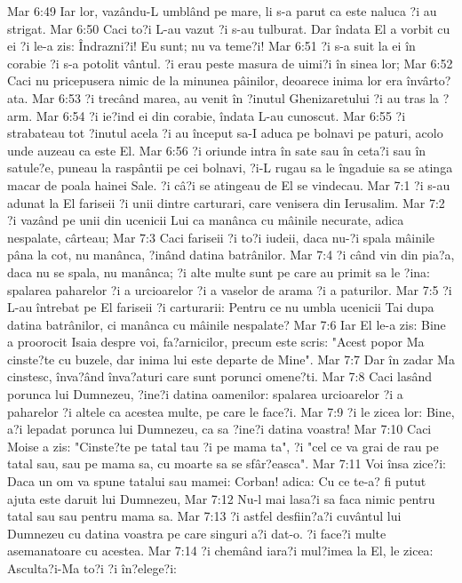 Mar 6:49  Iar lor, vazându-L umblând pe mare, li s-a parut ca este naluca ?i au strigat.
Mar 6:50  Caci to?i L-au vazut ?i s-au tulburat. Dar îndata El a vorbit cu ei ?i le-a zis: Îndrazni?i! Eu sunt; nu va teme?i!
Mar 6:51  ?i s-a suit la ei în corabie ?i s-a potolit vântul. ?i erau peste masura de uimi?i în sinea lor;
Mar 6:52  Caci nu pricepusera nimic de la minunea pâinilor, deoarece inima lor era învârto?ata.
Mar 6:53  ?i trecând marea, au venit în ?inutul Ghenizaretului ?i au tras la ?arm.
Mar 6:54  ?i ie?ind ei din corabie, îndata L-au cunoscut.
Mar 6:55  ?i strabateau tot ?inutul acela ?i au început sa-I aduca pe bolnavi pe paturi, acolo unde auzeau ca este El.
Mar 6:56  ?i oriunde intra în sate sau în ceta?i sau în satule?e, puneau la raspântii pe cei bolnavi, ?i-L rugau sa le îngaduie sa se atinga macar de poala hainei Sale. ?i câ?i se atingeau de El se vindecau.
Mar 7:1  ?i s-au adunat la El fariseii ?i unii dintre carturari, care venisera din Ierusalim.
Mar 7:2  ?i vazând pe unii din ucenicii Lui ca manânca cu mâinile necurate, adica nespalate, cârteau;
Mar 7:3  Caci fariseii ?i to?i iudeii, daca nu-?i spala mâinile pâna la cot, nu manânca, ?inând datina batrânilor.
Mar 7:4  ?i când vin din pia?a, daca nu se spala, nu manânca; ?i alte multe sunt pe care au primit sa le ?ina: spalarea paharelor ?i a urcioarelor ?i a vaselor de arama ?i a paturilor.
Mar 7:5  ?i L-au întrebat pe El fariseii ?i carturarii: Pentru ce nu umbla ucenicii Tai dupa datina batrânilor, ci manânca cu mâinile nespalate?
Mar 7:6  Iar El le-a zis: Bine a proorocit Isaia despre voi, fa?arnicilor, precum este scris: "Acest popor Ma cinste?te cu buzele, dar inima lui este departe de Mine".
Mar 7:7  Dar în zadar Ma cinstesc, înva?ând înva?aturi care sunt porunci omene?ti.
Mar 7:8  Caci lasând porunca lui Dumnezeu, ?ine?i datina oamenilor: spalarea urcioarelor ?i a paharelor ?i altele ca acestea multe, pe care le face?i.
Mar 7:9  ?i le zicea lor: Bine, a?i lepadat porunca lui Dumnezeu, ca sa ?ine?i datina voastra!
Mar 7:10  Caci Moise a zis: "Cinste?te pe tatal tau ?i pe mama ta", ?i "cel ce va grai de rau pe tatal sau, sau pe mama sa, cu moarte sa se sfâr?easca".
Mar 7:11  Voi însa zice?i: Daca un om va spune tatalui sau mamei: Corban! adica: Cu ce te-a? fi putut ajuta este daruit lui Dumnezeu,
Mar 7:12  Nu-l mai lasa?i sa faca nimic pentru tatal sau sau pentru mama sa.
Mar 7:13  ?i astfel desfiin?a?i cuvântul lui Dumnezeu cu datina voastra pe care singuri a?i dat-o. ?i face?i multe asemanatoare cu acestea.
Mar 7:14  ?i chemând iara?i mul?imea la El, le zicea: Asculta?i-Ma to?i ?i în?elege?i:

